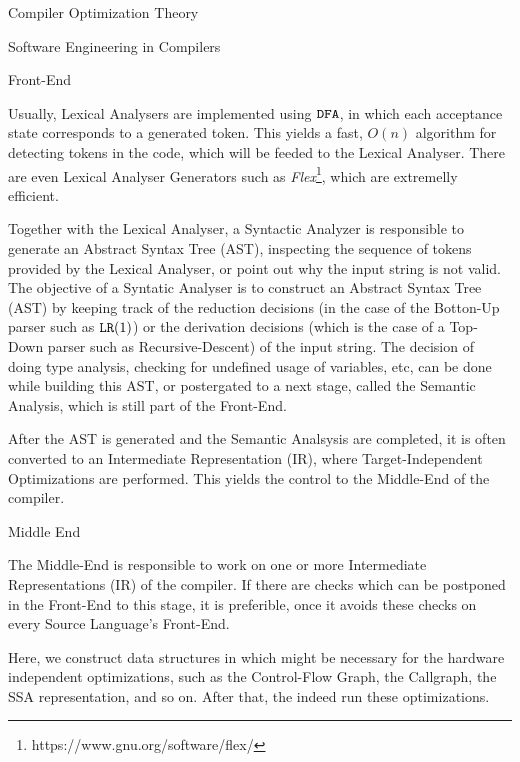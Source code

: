 \begin{section}{Compiler Optimization Theory}
\begin{section}{Software Engineering in Compilers}
\begin{subsection}{Front-End}

Usually, Lexical Analysers are implemented using $\texttt{DFA}$, in which each
acceptance state corresponds to a generated token. This yields a fast,
$O(n)$ algorithm for detecting tokens in the code, which will be feeded
to the Lexical Analyser. There are even Lexical Analyser Generators such
as \textit{Flex}\footnote{https://www.gnu.org/software/flex/}, which
are extremelly efficient.

Together with the Lexical Analyser, a Syntactic Analyzer is responsible to
generate an Abstract Syntax Tree (AST), inspecting the sequence of tokens
provided by the Lexical Analyser, or point out why the input string is
not valid. The objective of a Syntatic Analyser is to construct
an Abstract Syntax Tree (AST) by keeping track of the reduction decisions
(in the case of the Botton-Up parser such as $\texttt{LR}(1)$) or the derivation
decisions (which is the case of a Top-Down parser such as Recursive-Descent)
of the input string. The decision of doing type analysis, checking for
undefined usage of variables, etc, can be done while building this
AST, or postergated to a next stage, called the Semantic Analysis,
which is still part of the Front-End.

After the AST is generated and the Semantic Analsysis are completed, it is
often converted to an Intermediate Representation (IR), where Target-Independent
Optimizations are performed. This yields the control to the Middle-End of
the compiler.

\end{subsection}

\begin{subsection}{Middle End}

The Middle-End is responsible to work on one or more Intermediate Representations
(IR) of the compiler. If there are checks which can be postponed in the Front-End
to this stage, it is preferible, once it avoids these checks on every Source
Language's Front-End.

Here, we construct data structures in which might be necessary for the hardware
independent optimizations, such as the Control-Flow Graph, the Callgraph, the
SSA representation, and so on. After that, the indeed run these optimizations.


\end{subsection}
\end{section}
\end{section}
